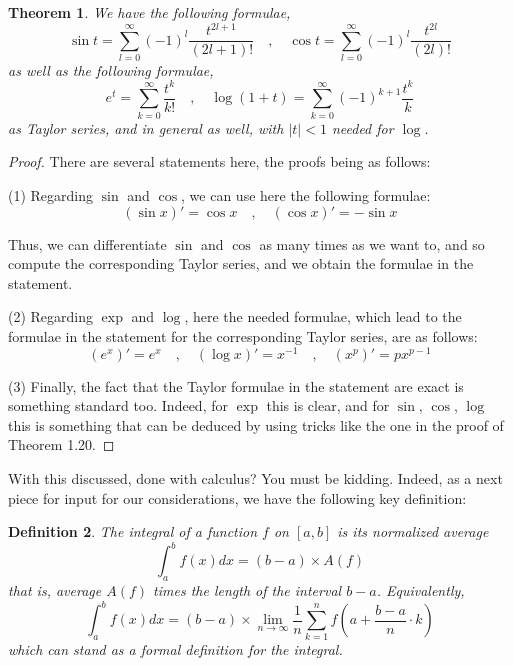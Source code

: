 \documentclass[12pt]{amsbook}
\newtheorem{theorem}{Theorem}[chapter]
\newtheorem{definition}[theorem]{Definition}
\begin{document}

\begin{theorem}
We have the following formulae,
$$\sin t=\sum_{l=0}^\infty(-1)^l\frac{t^{2l+1}}{(2l+1)!}\quad,\quad 
\cos t=\sum_{l=0}^\infty(-1)^l\frac{t^{2l}}{(2l)!}$$
as well as the following formulae,
$$e^t=\sum_{k=0}^\infty\frac{t^k}{k!}\quad,\quad 
\log(1+t)=\sum_{k=0}^\infty(-1)^{k+1}\frac{t^k}{k}$$
as Taylor series, and in general as well, with $|t|<1$ needed for $\log$.
\end{theorem}

\begin{proof}
There are several statements here, the proofs being as follows:

\medskip

(1) Regarding $\sin$ and $\cos$, we can use here the following formulae:
$$(\sin x)'=\cos x\quad,\quad 
(\cos x)'=-\sin x$$

Thus, we can differentiate $\sin$ and $\cos$ as many times as we want to, and so compute the corresponding Taylor series, and we obtain the formulae in the statement.

\medskip

(2) Regarding $\exp$ and $\log$, here the needed formulae, which lead to the formulae in the statement for the corresponding Taylor series, are as follows:
$$(e^x)'=e^x\quad,\quad 
(\log x)'=x^{-1}\quad,\quad
(x^p)'=px^{p-1}$$

(3) Finally, the fact that the Taylor formulae in the statement are exact is something standard too. Indeed, for $\exp$ this is clear, and for $\sin$, $\cos$, $\log$ this is something that can be deduced by using tricks like the one in the proof of Theorem 1.20.
\end{proof}

With this discussed, done with calculus? You must be kidding. Indeed, as a next piece for input for our considerations, we have the following key definition:


\begin{definition}
The integral of a function $f$ on $[a,b]$ is its normalized average
$$\int_a^bf(x)dx=(b-a)\times A(f)$$
that is, average $A(f)$ times the length of the interval $b-a$. Equivalently, 
$$\int_a^bf(x)dx=(b-a)\times\lim_{n\to\infty}\frac{1}{n}\sum_{k=1}^nf\left(a+\frac{b-a}{n}\cdot k\right)$$
which can stand as a formal definition for the integral.
\end{definition}
\end{document}
